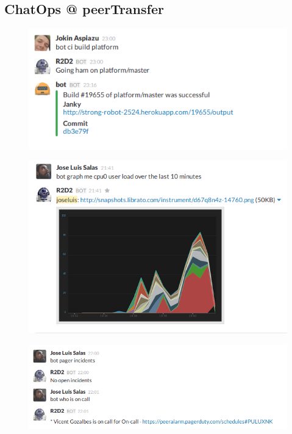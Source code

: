 \documentclass[
paper=128mm:96mm, %
fontsize=11pt, %
pagesize, %
parskip=half-, %
]{scrartcl} %
\theoremstyle{mythmstyle} %
\begin{document}


\subsection{ChatOps @ peerTransfer}

\begin{figure}[h]
\centering\includegraphics[width=0.8\linewidth]{cibuild.png}
\end{figure}

\clearpage


\begin{figure}[h]
\centering\includegraphics[width=0.8\linewidth]{librato.png}
\end{figure}

\clearpage


\begin{figure}[h]
\centering\includegraphics[width=0.8\linewidth]{pagerduty.png}
\end{figure}
\end{document}
